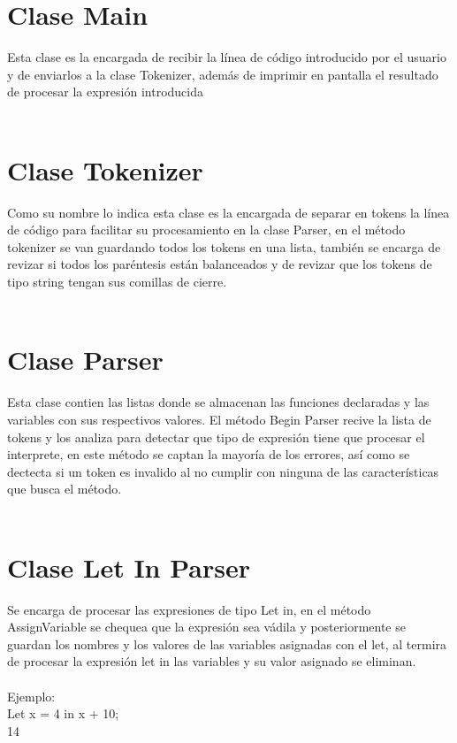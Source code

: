 \documentclass{article}
\begin{document}
\section{Clase Main}
Esta clase es la encargada de recibir la línea de código introducido por el usuario y de enviarlos a la clase Tokenizer, además de imprimir en pantalla el resultado de procesar la expresión introducida \\ \\

\section{Clase Tokenizer}
Como su nombre lo indica esta clase es la encargada de separar en tokens la línea de código para facilitar su procesamiento en la clase Parser, en el método tokenizer se van guardando todos los tokens en una lista, también se encarga de revizar si todos los paréntesis están balanceados y de revizar que los tokens de tipo string tengan sus comillas de cierre.\\ \\ 

\section{Clase Parser}
Esta clase contien las listas donde se almacenan las funciones declaradas y las variables con sus respectivos valores. El método Begin Parser recive la lista de tokens y los analiza para detectar que tipo de expresión tiene que procesar el interprete, en este método se captan la mayoría de los errores, así como se dectecta si un token es invalido al no cumplir con ninguna de las características que busca el método.\\ \\

\section{Clase Let In Parser}
Se encarga de procesar las expresiones de tipo Let in, en el método AssignVariable se chequea que la expresión sea vádila y posteriormente se guardan los nombres y los valores de las variables asignadas con el let, al termira de procesar la expresión let in las variables y su valor asignado se eliminan. \\  \\ Ejemplo: \\ Let x = 4 in x  + 10; \\ 14 \\ \\ 
\end{document}
